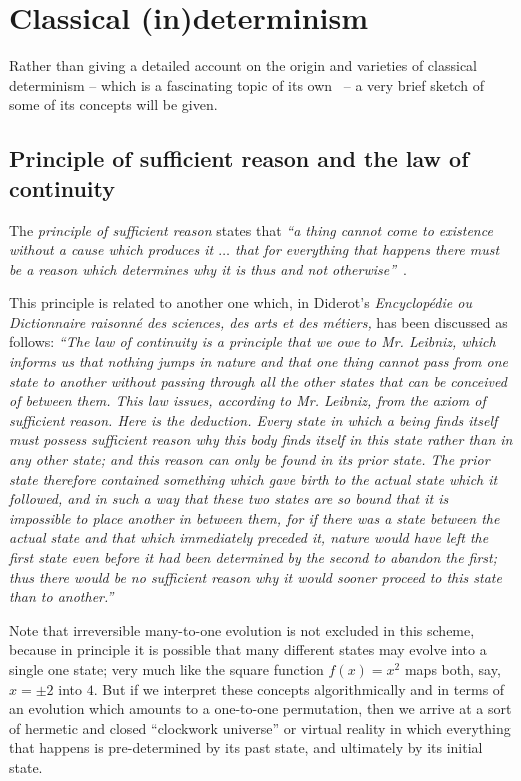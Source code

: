 \chapter{Classical (in)determinism}

Rather than giving a detailed account on the origin and varieties of classical determinism
--
which is a fascinating topic of its own~\cite{Hacking-83,Earman-1986,Earman20071369,vanStrien201424,vanStrien2014,sep-determinism-causal,Werndl-DeterminismandIndeterminism}
--
a very brief sketch of some of its concepts will be given.

\section{Principle of sufficient reason and the law of continuity}

The {\em principle of sufficient reason}
states that {\em ``a thing cannot come to existence without a
cause which produces it $\ldots $
that for everything that happens there must be
a reason which determines why it is thus and not otherwise''}~\cite{vanStrien201424}.

This principle is related to another one which, in Diderot's {\em Encyclop\'edie ou Dictionnaire raisonn\'e des sciences, des arts et des m\'etiers,}
has been discussed as follows:
{\em ``The {\em law of continuity} 
is a principle that we owe to Mr. Leibniz,
which informs us that nothing jumps in nature and that one thing cannot pass from one state to another
without passing through all the other states that can be conceived of between them.
This law issues, according to Mr. Leibniz, from the axiom of sufficient reason.
Here is the deduction.
Every state in which a being finds itself must possess sufficient reason why this body finds itself
in this state rather than in any other state;
 and this reason can only be found in its prior state.
The prior state therefore contained something which gave birth to the actual state which it followed,
and in such a way that these two states are so bound that it is impossible to place another in between them,
for if there was a state between the actual state and that which immediately preceded it,
nature would have left the first state even before it had been determined by the second to abandon the first;
thus there would be no sufficient reason why it would sooner proceed to this state than to another.''}~\cite{Formey-continuity}

Note that irreversible many-to-one evolution is not excluded in this scheme, because in principle it is possible that
many different states may evolve into a single one state; very much like the square function $f(x)=x^2$ maps both, say, $x=\pm 2$ into $4$.
But if we interpret these concepts algorithmically and in terms of an evolution which amounts to a one-to-one permutation,
then we arrive at a sort of hermetic and closed ``clockwork universe'' or virtual reality in which everything
that happens is pre-determined by its past state, and ultimately by its initial state.



